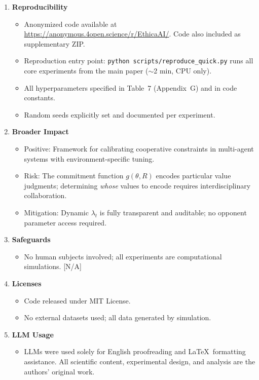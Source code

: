 \begin{enumerate}
\item {\bf Reproducibility}
\begin{itemize}
    \item[$\checkmark$] Anonymized code available at \url{https://anonymous.4open.science/r/EthicaAI/}. Code also included as supplementary ZIP.
    \item[$\checkmark$] Reproduction entry point: \texttt{python scripts/reproduce\_quick.py} runs all core experiments from the main paper ($\sim$2 min, CPU only).
    \item[$\checkmark$] All hyperparameters specified in Table~7 (Appendix~G) and in code constants.
    \item[$\checkmark$] Random seeds explicitly set and documented per experiment.
\end{itemize}

\item {\bf Broader Impact}
\begin{itemize}
    \item[$\checkmark$] Positive: Framework for calibrating cooperative constraints in multi-agent systems with environment-specific tuning.
    \item[$\checkmark$] Risk: The commitment function $g(\theta, R)$ encodes particular value judgments; determining \emph{whose} values to encode requires interdisciplinary collaboration.
    \item[$\checkmark$] Mitigation: Dynamic $\lambda_t$ is fully transparent and auditable; no opponent parameter access required.
\end{itemize}

\item {\bf Safeguards}
\begin{itemize}
    \item[$\checkmark$] No human subjects involved; all experiments are computational simulations. [N/A]
\end{itemize}

\item {\bf Licenses}
\begin{itemize}
    \item[$\checkmark$] Code released under MIT License.
    \item[$\checkmark$] No external datasets used; all data generated by simulation.
\end{itemize}

\item {\bf LLM Usage}
\begin{itemize}
    \item[$\checkmark$] LLMs were used solely for English proofreading and \LaTeX\ formatting assistance. All scientific content, experimental design, and analysis are the authors' original work.
\end{itemize}

\end{enumerate}
